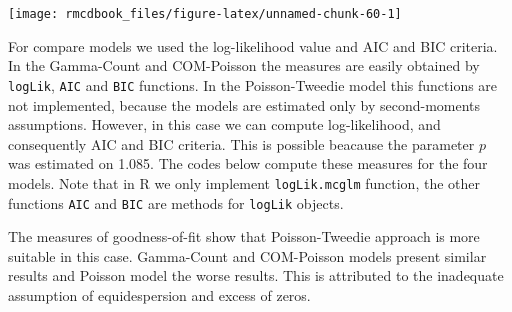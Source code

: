\documentclass[9pt,a5paper,]{book}
\theoremstyle{definition}
\theoremstyle{definition}
\theoremstyle{remark}
\begin{document}
\begin{center}\texttt{[image: rmcdbook\_files/figure-latex/unnamed-chunk-60-1]} \end{center}

For compare models we used the log-likelihood value and AIC and BIC
criteria. In the Gamma-Count and COM-Poisson the measures are easily
obtained by \texttt{logLik}, \texttt{AIC} and \texttt{BIC} functions. In
the Poisson-Tweedie model this functions are not implemented, because
the models are estimated only by second-moments assumptions. However, in
this case we can compute log-likelihood, and consequently AIC and BIC
criteria. This is possible beacause the parameter \(p\) was estimated on
1.085. The codes below compute these measures for the four models. Note
that in R we only implement \texttt{logLik.mcglm} function, the other
functions \texttt{AIC} and \texttt{BIC} are methods for \texttt{logLik}
objects.

The measures of goodness-of-fit show that Poisson-Tweedie approach is
more suitable in this case. Gamma-Count and COM-Poisson models present
similar results and Poisson model the worse results. This is attributed
to the inadequate assumption of equidespersion and excess of zeros.
\end{document}
